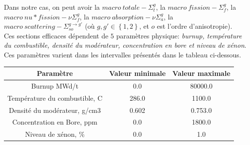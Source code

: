 Dans notre cas, on peut avoir la $macro\ totale-\Sigma_t^g$, la $macro\ fission-\Sigma_f^g$, la $macro\ nu*fission-\nu\Sigma_f^g$, la $macro\ absorption-\nu\Sigma_a^g$,
la $macro\ scattering-\Sigma_{so}^{g\rightarrow g'}$ (où $g,g' \in \left \{1,2\right\}$, et $o$ est l'ordre d'anisotropie).\\
Ces sections efficaces dépendent de $5$ paramètres physique: \textit{burnup, température du combustible, densité du modérateur, concentration en bore et niveau de xénon}.
Ces paramètres varient dans les intervalles présentés dans le tableau ci-dessous.\\

\begin{center}
\begin{tabular}{|*{3}{c|}}
	\hline
	Paramètre 											& Valeur minimale & Valeur maximale \\
	\hline
	Burnup MWd/t 										& 0.0 						& 80000.0 \\
	\hline
	Température du combustible, C		& 286.0 					& 1100.0	\\
	\hline
	Densité du modérateur, g/cm3 		& 0.602 					& 0.753.0 \\
	\hline
	Concentration en Bore, ppm 			& 0.0 						& 1800.0 	\\
	\hline
	Niveau de xénon, \% 						& 0.0 						& 1.0 		\\
	\hline
\end{tabular}
\end{center}

